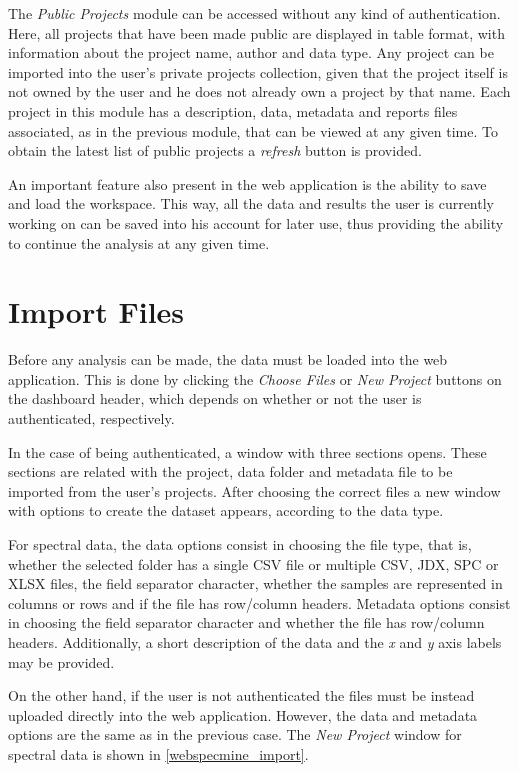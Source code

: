 The \textit{Public Projects} module can be accessed without any kind of authentication. Here, all projects that have been made public are displayed in table format, with information about the project name, author and data type. Any project can be imported into the user's private projects collection, given that the project itself is not owned by the user and he does not already own a project by that name. Each project in this module has a description, data, metadata and reports files associated, as in the previous module, that can be viewed at any given time. To obtain the latest list of public projects a \textit{refresh} button is provided.

An important feature also present in the web application is the ability to save and load the workspace. This way, all the data and results the user is currently working on can be saved into his account for later use, thus providing the ability to continue the analysis at any given time.

\section{Import Files} \label{import_files}

Before any analysis can be made, the data must be loaded into the web application. This is done by clicking the \textit{Choose Files} or \textit{New Project} buttons on the dashboard header, which depends on whether or not the user is authenticated, respectively.

In the case of being authenticated, a window with three sections opens. These sections are related with the project, data folder and metadata file to be imported from the user's projects. After choosing the correct files a new window with options to create the dataset appears, according to the data type. 

For spectral data, the data options consist in choosing the file type, that is, whether the selected folder has a single CSV file or multiple CSV, JDX, SPC or XLSX files, the field separator character, whether the samples are represented in columns or rows and if the file has row/column headers. Metadata options consist in choosing the field separator character and whether the file has row/column headers. Additionally, a short description of the data and the \textit{x} and \textit{y} axis labels may be provided. 

On the other hand, if the user is not authenticated the files must be instead uploaded directly into the web application. However, the data and metadata options are the same as in the previous case. The \textit{New Project} window for spectral data is shown in \autoref{webspecmine_import}.

